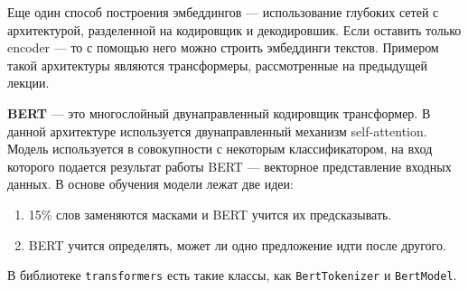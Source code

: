 Еще один способ построения эмбеддингов --- использование глубоких сетей с архитектурой, разделенной на кодировщик и декодировшик. Если оставить только encoder --- то с помощью него можно строить эмбеддинги текстов. Примером такой архитектуры являются трансформеры, рассмотренные на предыдущей лекции.

\begin{definition}
    \textbf{BERT} — это многослойный двунаправленный кодировщик трансформер. В данной архитектуре используется двунаправленный механизм self-attention. Модель используется в совокупности с некоторым классификатором, на вход которого подается результат работы BERT — векторное представление входных данных. В основе обучения модели лежат две идеи:
    \begin{enumerate}
        \item 15\% слов заменяются масками и BERT учится их предсказывать.
        \item BERT учится определять, может ли одно предложение идти после другого.
    \end{enumerate}
\end{definition}

\begin{remark}
    В библиотеке \texttt{transformers} есть такие классы, как \texttt{BertTokenizer} и \texttt{BertModel}.
\end{remark}
